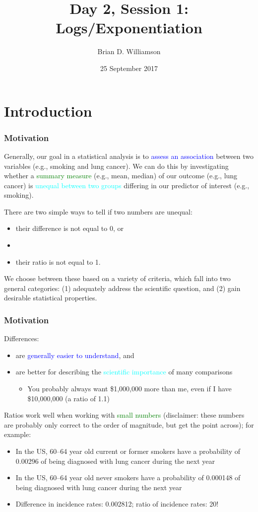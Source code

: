 \documentclass[11pt]{beamer}
\title{Day 2, Session 1: Logs/Exponentiation}
\author{Brian D. Williamson}
\institute{EPI/BIOST Bootcamp 2017}
\date{25 September 2017}
\newcommand{\myframe}[1]{\begin{frame} \frametitle{#1}}
\newenvironment{spaceitemize}
{ \begin{itemize}
    \setlength{\itemsep}{10pt}
    \setlength{\parskip}{0pt}
    \setlength{\parsep}{0pt}     }
{ \end{itemize}                  }
\begin{document}
\begin{frame}
\titlepage
\end{frame}

\section{Introduction}
\myframe{Motivation}
Generally, our goal in a statistical analysis is to \textcolor{blue}{assess an association} between two variables (e.g., smoking and lung cancer). We can do this by investigating whether a \textcolor{green}{summary measure} (e.g., mean, median) of our outcome (e.g., lung cancer) is \textcolor{cyan}{unequal between two groups} differing in our predictor of interest (e.g., smoking).

There are two simple ways to tell if two numbers are unequal: 
\begin{itemize}
\item their difference is not equal to 0, or
\item[]
\item their ratio is not equal to 1.
\end{itemize}

We choose between these based on a variety of criteria, which fall into two general categories: (1) adequately address the scientific question, and (2) gain desirable statistical properties.
\end{frame}

\myframe{Motivation}
Differences:
\vspace{-0.5cm}
\begin{spaceitemize}
\item are \textcolor{blue}{generally easier to understand}, and 
\item are better for describing the \textcolor{cyan}{scientific importance} of many comparisons
\begin{itemize}
\item You probably always want \$1,000,000 more than me, even if I have \$10,000,000 (a ratio of 1.1)
\end{itemize}
\end{spaceitemize}
Ratios work well when working with \textcolor{green}{small numbers} (disclaimer: these numbers are probably only correct to the order of magnitude, but get the point across); for example:
{\fontsize{10pt}{7.2}\selectfont
\begin{itemize}
\item In the US, 60--64 year old current or former smokers have a probability of 0.00296 of being diagnosed with lung cancer during the next year
\item In the US, 60--64 year old never smokers have a probability of 0.000148 of being diagnosed with lung cancer during the next year
\item Difference in incidence rates: 0.002812; ratio of incidence rates: 20!
\end{itemize}
}
\end{frame}
\end{document}
